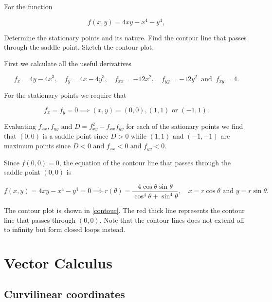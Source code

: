 \documentclass[english,a4paper,12pt]{report}
\begin{document}
{For the function 

\begin{equation}
	f(x,y) = 4xy - x^4 - y^4,
\end{equation}

Determine the stationary points and its nature. Find the contour line that passes through the saddle point. Sketch the contour plot.
}
{First we calculate all the useful derivatives 

\begin{equation}
	f_{x} = 4y-4x^3 , \quad f_{y} = 4x-4y^3 , \quad f_{xx} = -12x^2, \quad f_{yy} = -12y^2 ~\text { and }~ f_{xy} = 4.   
\end{equation}

For the stationary points we require that

\begin{equation}
	f_{x} = f_{y} = 0 \implies (x,y) = (0,0), (1,1) \text { or } (-1,1).  
\end{equation}

Evaluating \(f_{xx}, f_{yy} \text { and }  D = f_{xy}^2 - f_{xx}f_{yy}   \) for each of the sationary points we find that \((0,0)\) is a saddle point since \(D > 0\) while \((1,1) \text { and } (-1,-1)\) are maximum points since \(D < 0 \text { and } f_{xx } < 0 \text { and } f_{yy} <0  \). 

Since \(f(0,0) = 0\), the equation of the contour line that passes through the saddle point \((0,0)\) is 

\begin{equation}
	f(x,y) = 4xy - x^4 - y^4 = 0 \implies r(\theta ) = \frac{4 \cos \theta \sin \theta }{\cos ^4 \theta + \sin ^4 \theta }, \quad x = r \cos \theta \text { and } y = r \sin \theta . 
\end{equation}

The contour plot is shown in \cref{contour}. The red thick line represents the contour line that passes through \((0,0)\). Note that the contour lines does not extend off to infinity but form closed loops instead.
} 


\chapter{Vector Calculus}

\section{Curvilinear coordinates}
\end{document}
